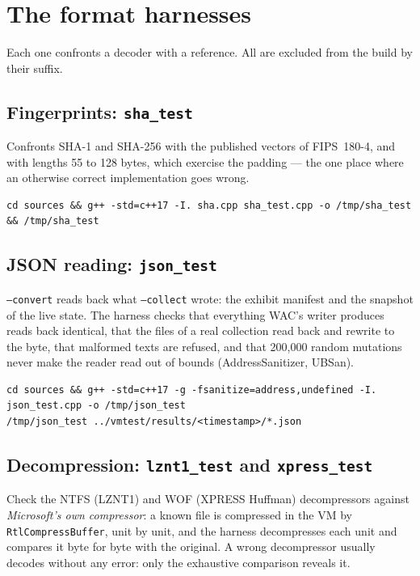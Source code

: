\documentclass[11pt,a4paper,oneside]{report}
\begin{document}
\chapter{The format harnesses}\label{ch:format}

Each one confronts a \wac{} decoder with a reference. All are excluded from the
\wac{} build by their  suffix.

\section{Fingerprints: \texttt{sha\_test}}

Confronts SHA-1 and SHA-256 with the published vectors of FIPS~180-4, and with
lengths 55 to 128 bytes, which exercise the padding — the one place where an
otherwise correct implementation goes wrong.

\begin{lstlisting}
cd sources && g++ -std=c++17 -I. sha.cpp sha_test.cpp -o /tmp/sha_test && /tmp/sha_test
\end{lstlisting}

\section{JSON reading: \texttt{json\_test}}

\texttt{--convert} reads back what \texttt{--collect} wrote: the exhibit
manifest and the snapshot of the live state. The harness checks that
everything WAC's writer produces reads back identical, that the files of a real
collection read back and rewrite to the byte, that malformed texts are refused,
and that 200,000 random mutations never make the reader read out of bounds
(AddressSanitizer, UBSan).

\begin{lstlisting}
cd sources && g++ -std=c++17 -g -fsanitize=address,undefined -I. json_test.cpp -o /tmp/json_test
/tmp/json_test ../vmtest/results/<timestamp>/*.json
\end{lstlisting}

\section{Decompression: \texttt{lznt1\_test} and \texttt{xpress\_test}}

Check the NTFS (LZNT1) and WOF (XPRESS Huffman) decompressors against
\emph{Microsoft's own compressor}: a known file is compressed in the VM by
\texttt{RtlCompressBuffer}, unit by unit, and the harness decompresses each unit
and compares it byte for byte with the original. A wrong decompressor usually
decodes without any error: only the exhaustive comparison reveals it.
\end{document}
